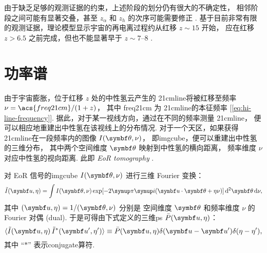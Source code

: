 由于缺乏足够的观测证据的约束，上述阶段的划分仍有很大的不确定性，
相邻阶段之间可能有显著交叠，甚至 $z_{\alpha}$ 和 $z_h$ 的次序可能需要修正
\cite{nusser2005,pritchard2012}.
基于目前非常有限的观测证据，理论模型显示宇宙的再电离过程约从红移 $z \sim 15$ 开始，
应在红移 $z > 6.5$ 之前完成，但也不能显著早于 $z \sim \numrange{7}{8}$
\cite{choudhury2006,pritchard2010mn}.

\section{功率谱}
\label{sec:ps}

由于宇宙膨胀，位于红移 $z$ 处的中性氢云产生的 \ac{21cmline}将被红移至频率
$\nu = \acs{freq21cm} / (1 + z)$，
其中 \acs{freq21cm} 为 \ac{21cmline}的本征频率
[\autoref{eq:hi-line-frequency}].
据此，对于某一视线方向，通过在不同的频率测量 \ac{21cmline}，
便可以相应地重建出中性氢在该视线上的分布情况.
对于一个天区，如果获得 \ac{21cmline}在一段频率内的图像 $I(\B{\theta},\nu)$，
即\ac{imgcube}，便可以重建出中性氢的三维分布，
其中两个空间维度 $\B{\theta}$ 映射到中性氢的横向距离，
频率维度 $\nu$ 对应中性氢的视向距离.
此即 \emph{EoR \acf{tomography}} \cite{mellema2015}.

对 EoR 信号的\ac{imgcube} $I(\B{\theta},\nu)$ 进行三维 Fourier 变换：
\begin{equation}
  \label{eq:ft3d}
  \tilde{I}(\B{u}, \eta) =
    \int I(\B{\theta},\nu) \exp[ -2\Cpi\Ci (\B{u}\cdot\B{\theta} + \eta\nu) ]
    \,\mathrm{d}^2\B{\theta}\,\D{\nu} ,
\end{equation}
其中 $(\B{u}, \eta) = 1 / (\B{\theta}, \nu)$ 分别是
空间维度 $\B{\theta}$ 和频率维度 $\nu$ 的 Fourier 对偶 (dual).
于是可得由下式定义的三维\ac{ps} $\bar{P}(\B{u}, \eta)$：
\begin{equation}
  \label{eq:ps3d}
  \langle \tilde{I}(\B{u}, \eta) \, \tilde{I}^*(\B{u}', \eta') \rangle
    \equiv \bar{P}(\B{u}, \eta) \delta(\B{u}-\B{u}') \delta(\eta-\eta') ,
\end{equation}
其中 \enquote{$*$} 表示\ac{conjugate}算符.

